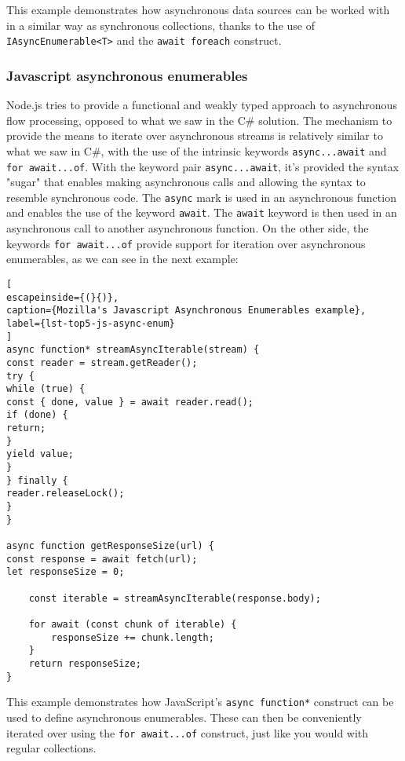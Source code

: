 This example demonstrates how asynchronous data sources can be worked with in a similar way as synchronous collections, thanks to the use of \texttt{IAsyncEnumerable<T>} and the \texttt{await foreach} construct.

\subsubsection{Javascript asynchronous enumerables}
\label{jsae}

Node.js tries to provide a functional and weakly typed approach to asynchronous flow processing, opposed to what we saw in the C\# solution.
The mechanism to provide the means to iterate over asynchronous streams is relatively similar to what we saw in C\#, with the use of the intrinsic keywords \texttt{async...await} and \texttt{for await...of}.
With the keyword pair \texttt{async...await}, it's provided the syntax "sugar" that enables making asynchronous calls and allowing the syntax to resemble synchronous code. The \texttt{async} mark is used in an asynchronous function and enables the use of the keyword \texttt{await}. The \texttt{await} keyword is then used in an asynchronous call to another asynchronous function.
On the other side, the keywords \texttt{for await...of} provide support for iteration over asynchronous enumerables, as we can see in the next example:

\begin{center}
\lstset{basicstyle=\scriptsize\ttfamily,frame=bottomline}
\centering
\begin{lstlisting}[
escapeinside={(}{)},
caption={Mozilla's Javascript Asynchronous Enumerables example},
label={lst-top5-js-async-enum}
]
async function* streamAsyncIterable(stream) {
const reader = stream.getReader();
try {
while (true) {
const { done, value } = await reader.read();
if (done) {
return;
}
yield value;
}
} finally {
reader.releaseLock();
}
}

async function getResponseSize(url) {
const response = await fetch(url);
let responseSize = 0;
	
	const iterable = streamAsyncIterable(response.body);
	
	for await (const chunk of iterable) {
		responseSize += chunk.length;
	}
	return responseSize;
}  
	\end{lstlisting}
\end{center}

This example demonstrates how JavaScript's \texttt{async function*} construct can be used to define asynchronous enumerables. These can then be conveniently iterated over using the \texttt{for await...of} construct, just like you would with regular collections.

